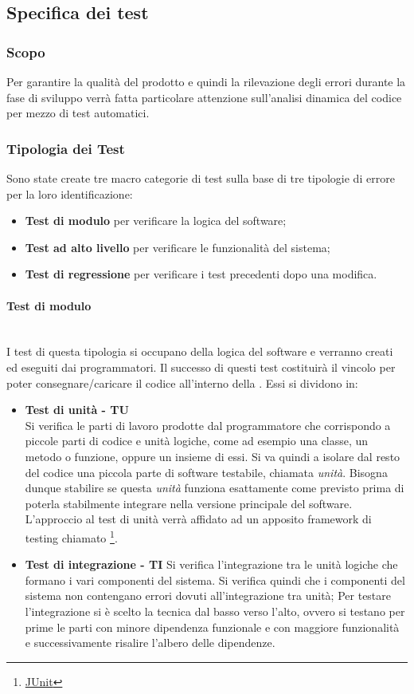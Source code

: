 \subsection{Specifica dei test}
\label{sec:specifica_test}
\subsubsection{Scopo}
\label{sec:test_scopo}
Per garantire la qualità del prodotto e quindi la rilevazione degli errori durante la fase di sviluppo verrà fatta particolare attenzione sull'analisi dinamica del codice per mezzo di test automatici.
\subsubsection{Tipologia dei Test}
\label{sec:tipologia_test}
Sono state create tre macro categorie di test sulla base di tre tipologie di errore per la loro identificazione:
\begin{itemize}
	\item \textbf{Test di modulo} per verificare la logica del software;
	\item \textbf{Test ad alto livello} per verificare le funzionalità del sistema;
	\item \textbf{Test di regressione} per verificare i test precedenti dopo una modifica.
\end{itemize} 
\paragraph{Test di modulo}\mbox{}\\[0.4cm]
I test di questa tipologia si occupano della  logica del software e verranno creati ed eseguiti dai programmatori. Il successo di questi test costituirà il vincolo per poter consegnare/caricare il codice all'interno della .
Essi si dividono in:
\begin{itemize}
	\item \textbf{Test di unità - TU}\\
	Si verifica le parti di lavoro prodotte dal programmatore che corrispondo a piccole parti di codice e unità logiche, come ad esempio una classe, un metodo o funzione, oppure un insieme di essi.
	Si va quindi a isolare dal resto del codice una piccola parte di software testabile, chiamata \textit{unità}. Bisogna dunque stabilire se questa \textit{unità} funziona esattamente come previsto prima di poterla stabilmente integrare nella versione principale del software. L'approccio al test di unità verrà affidato ad un apposito framework di testing chiamato \footnote{\href{https://junit.org/junit5/}{JUnit}}.
	\item \textbf{Test di integrazione - TI}
	Si verifica l'integrazione tra le unità logiche che formano i vari componenti del sistema. Si verifica quindi che i componenti del sistema non contengano errori dovuti all'integrazione tra unità;
	Per testare l'integrazione si è scelto la tecnica dal basso verso l'alto, ovvero si testano per prime le parti con minore dipendenza funzionale e con maggiore funzionalità e successivamente risalire l'albero delle dipendenze.	
\end{itemize} 

